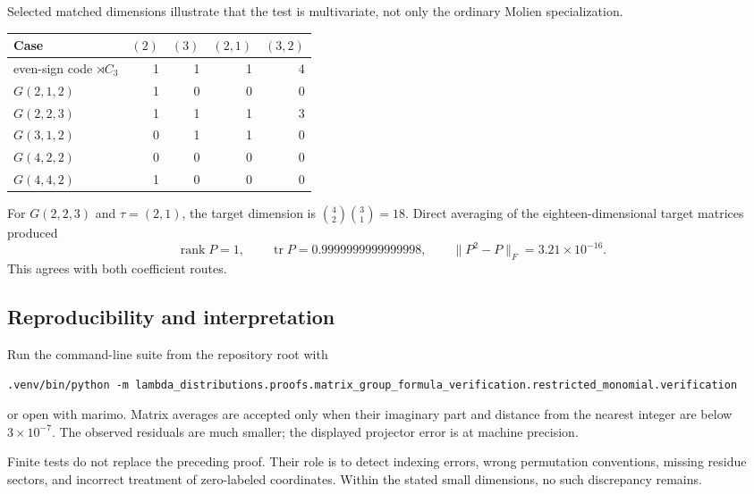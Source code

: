 \documentclass[10pt]{article}
\begin{document}
Selected matched dimensions illustrate that the test is multivariate, not only
the ordinary Molien specialization.
\begin{center}
\begin{tabular}{@{}lrrrr@{}}
\toprule
Case & $(2)$ & $(3)$ & $(2,1)$ & $(3,2)$\\
\midrule
even-sign code $\rtimes C_3$ & 1 & 1 & 1 & 4\\
$G(2,1,2)$ & 1 & 0 & 0 & 0\\
$G(2,2,3)$ & 1 & 1 & 1 & 3\\
$G(3,1,2)$ & 0 & 1 & 1 & 0\\
$G(4,2,2)$ & 0 & 0 & 0 & 0\\
$G(4,4,2)$ & 1 & 0 & 0 & 0\\
\bottomrule
\end{tabular}
\end{center}

For $G(2,2,3)$ and $\tau=(2,1)$, the target dimension is
$\binom{4}{2}\binom{3}{1}=18$.  Direct averaging of the eighteen-dimensional
target matrices produced
\[
\operatorname{rank}P=1,\qquad \operatorname{tr}P=0.9999999999999998,
\qquad\|P^2-P\|_F=3.21\times10^{-16}.
\]
This agrees with both coefficient routes.

\subsection{Reproducibility and interpretation}

Run the command-line suite from the repository root with
{\scriptsize
\begin{verbatim}
.venv/bin/python -m lambda_distributions.proofs.matrix_group_formula_verification.restricted_monomial.verification
\end{verbatim}
}
or open
with marimo.  Matrix
averages are accepted only when their imaginary part and distance from the
nearest integer are below $3\times10^{-7}$.  The observed residuals are much
smaller; the displayed projector error is at machine precision.

Finite tests do not replace the preceding proof.  Their role is to detect
indexing errors, wrong permutation conventions, missing residue sectors, and
incorrect treatment of zero-labeled coordinates.  Within the stated small
dimensions, no such discrepancy remains.
\endgroup


\clearpage
\end{document}
